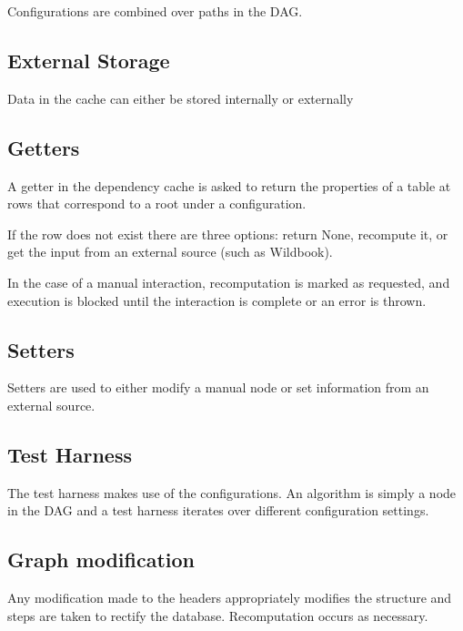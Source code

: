             Configurations are combined over paths in the DAG{}.

        \subsection{External Storage}

            Data in the cache can either be stored internally or
            externally

        \subsection{Getters}

            A getter in the dependency cache is asked to return the properties
              of a table at rows that correspond to a root under a
              configuration.

            If the row does not exist there are three options:
            return None, recompute it, or get the input from an external
              source (such as Wildbook).

            In the case of a manual interaction, recomputation is
              marked as requested, and execution is blocked until the
              interaction is complete or an error is thrown.

        \subsection{Setters}
           
            Setters are used to either modify a manual node or set
              information from an external source.

        \subsection{Test Harness}\label{sec:testharn}
         
            The test harness makes use of the configurations.
            An algorithm is simply a node in the DAG and a test
              harness iterates over different configuration settings.

        \subsection{Graph modification}\label{sec:modification}

            Any modification made to the headers appropriately
              modifies the structure and steps are taken to rectify the
              database.
            Recomputation occurs as necessary.

